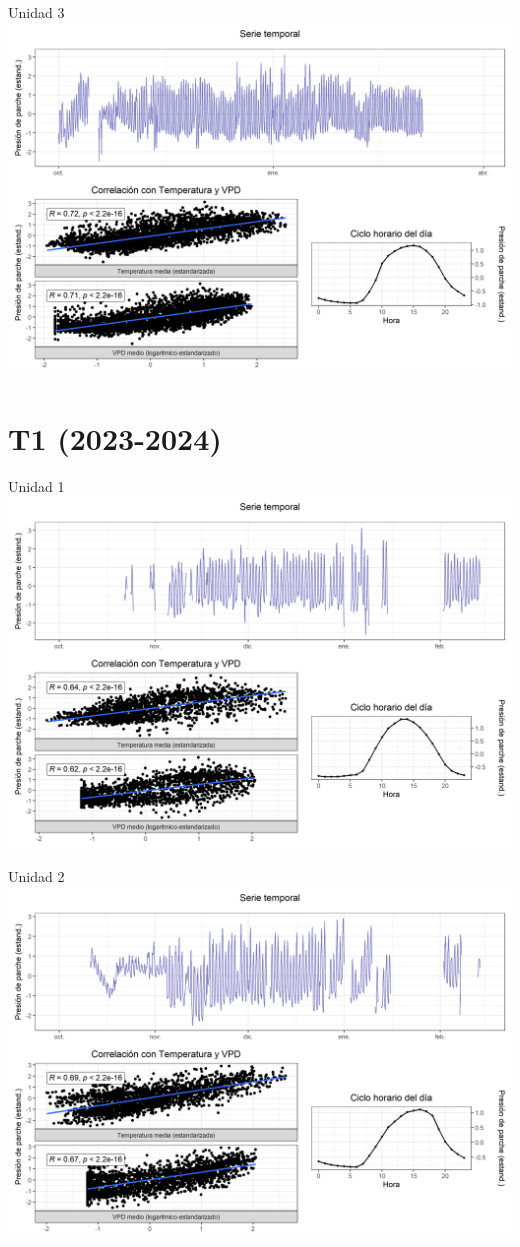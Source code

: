 \documentclass[
  letterpaper,
  DIV=11,
  numbers=noendperiod]{scrreprt}
\begin{document}
Unidad 3
\includegraphics{figuras/04_turgor_unidad/2022_2023_La_Esperanza_T4_Unidad_3.png}

\chapter{T1 (2023-2024)}

Unidad 1
\includegraphics{figuras/04_turgor_unidad/2023_2024_La_Esperanza_T1_Unidad_1.png}

Unidad 2
\includegraphics{figuras/04_turgor_unidad/2023_2024_La_Esperanza_T1_Unidad_2.png}
\end{document}
